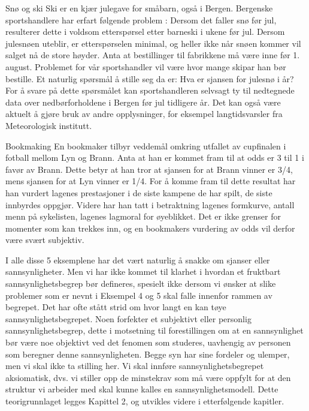 \begin{eksempel}{Snø og ski}
Ski er en kjær julegave for småbarn, også i Bergen.  Bergenske
sports\-handlere har erfart følgende problem :  Dersom det faller
snø før jul, resulterer dette i voldsom etterspørsel etter
barneski i ukene før jul.  Dersom julesnøen uteblir, er
etterspørselen minimal, og heller ikke når snøen kommer vil salget
nå de store høyder.  Anta at bestillinger til fabrikkene må
være inne før 1. august.  Problemet for vår sportshandler vil
være hvor mange skipar han bør bestille.  Et naturlig spørsmål
å stille seg da er:  Hva er sjansen for julesnø i år?  For å
svare på dette spørsmålet kan sportshandleren selvsagt ty til
nedtegnede data over nedbørforholdene i Bergen før jul tidligere år. 
Det kan også være aktuelt å gjøre bruk av andre opplysninger,
for eksempel langtidsvarsler fra Meteorologisk institutt.
\end{eksempel}


\begin{eksempel}{Bookmaking}
En bookmaker tilbyr veddemål omkring utfallet av cupfinalen i
fotball mellom Lyn og Brann.  Anta at han er kommet fram til at
odds er 3 til 1 i favør av Brann.  Dette betyr at han tror at
sjansen for at Brann vinner er 3/4, mens sjansen for at Lyn
vinner er 1/4.  For å komme fram til dette resultat har han
vurdert lagenes prestasjoner i de siste kampene de har spilt, de
siste innbyrdes oppgjør.  Videre har han tatt i betraktning
lagenes formkurve, antall menn på sykelisten, lagenes lagmoral
for øyeblikket.  Det er ikke grenser for momenter som kan trekkes
inn, og en bookmakers vurdering av odds vil derfor være svært
subjektiv.
\end{eksempel}

I alle disse 5 eksemplene har det vært naturlig å snakke om
sjanser eller sannsynligheter.  Men vi har ikke kommet til
klarhet i hvordan et fruktbart sannsynlighetsbegrep bør defineres,
spesielt ikke dersom vi ønsker at slike problemer som er
nevnt i Eksempel 4 og 5 skal falle innenfor rammen av begrepet. 
Det har ofte stått strid om hvor langt en kan tøye 
sannsynlighetsbegrepet.  Noen forfekter et subjektivt eller
personlig sannsynlighetsbegrep, dette i motsetning til forestillingen
om at en sannsynlighet bør være noe objektivt ved det
fenomen som studeres, uavhengig av personen som beregner denne
sannsynligheten.  Begge syn har sine fordeler og ulemper, men vi
skal ikke ta stilling her.  Vi skal innføre
sannsynlighetsbegrepet aksiomatisk, dvs. vi stiller opp de minstekrav
som må være oppfylt for at den struktur vi arbeider med skal kunne
kalles en sannsynlighetsmodell. Dette teorigrunnlaget legges
Kapittel 2, og utvikles videre i etterfølgende kapitler.
           


